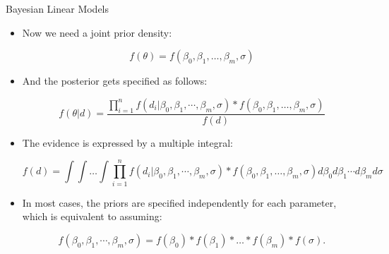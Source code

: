 \documentclass[handout]{beamer}
\begin{document}
\begin{frame}{Bayesian Linear Models}
\scriptsize{
\begin{itemize}


\item Now we need a joint prior density:

\begin{displaymath}
f(\theta)= f(\beta_0,\beta_1,\dots,\beta_m,\sigma)
\end{displaymath}


\item And the posterior gets specified as follows:

\begin{displaymath}
f(\theta|d)= \frac{ \prod_{i=1}^n f(d_i|\beta_0,\beta_1,\cdots,\beta_m,\sigma)*f(\beta_0,\beta_1,\dots,\beta_m,\sigma)}{f(d)}
\end{displaymath}


\item The evidence is expressed by a multiple integral:

\begin{displaymath}
 f(d) = \int \int \dots \int \prod_{i=1}^n f(d_i|\beta_0,\beta_1,\cdots,\beta_m,\sigma)* f(\beta_0,\beta_1,\dots,\beta_m,\sigma) d\beta_0 d\beta_1 \cdots d\beta_md\sigma
\end{displaymath}



\item In most cases, the priors are specified independently for each parameter, which is equivalent to assuming:


\begin{displaymath}
f(\beta_0,\beta_1,\cdots,\beta_m,\sigma)=f(\beta_0)*f(\beta_1)*\dots*f(\beta_m)*f(\sigma). 
\end{displaymath}






 
\end{itemize}



} 

\end{frame}
\end{document}
